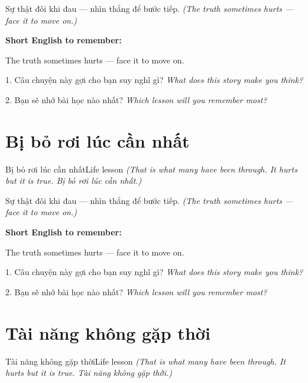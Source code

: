 \begin{baihoc}
Sự thật đôi khi đau — nhìn thẳng để bước tiếp.
\textit{(The truth sometimes hurts — face it to move on.)}
\end{baihoc}

\begin{ghinhoanh}
\textbf{Short English to remember:}

The truth sometimes hurts — face it to move on.

\end{ghinhoanh}

\begin{tuhocnhanh}
1. Câu chuyện này gợi cho bạn suy nghĩ gì? \textit{What does this story make you think?}

2. Bạn sẽ nhớ bài học nào nhất? \textit{Which lesson will you remember most?}
\end{tuhocnhanh}
\ngancach


\section{Bị bỏ rơi lúc cần nhất}
\begin{truyen}{Bị bỏ rơi lúc cần nhất}{Life lesson}
\textit{(That is what many have been through. It hurts but it is true. Bị bỏ rơi lúc cần nhất.)}
\end{truyen}

\begin{baihoc}
Sự thật đôi khi đau — nhìn thẳng để bước tiếp.
\textit{(The truth sometimes hurts — face it to move on.)}
\end{baihoc}

\begin{ghinhoanh}
\textbf{Short English to remember:}

The truth sometimes hurts — face it to move on.

\end{ghinhoanh}

\begin{tuhocnhanh}
1. Câu chuyện này gợi cho bạn suy nghĩ gì? \textit{What does this story make you think?}

2. Bạn sẽ nhớ bài học nào nhất? \textit{Which lesson will you remember most?}
\end{tuhocnhanh}
\ngancach


\section{Tài năng không gặp thời}
\begin{truyen}{Tài năng không gặp thời}{Life lesson}
\textit{(That is what many have been through. It hurts but it is true. Tài năng không gặp thời.)}
\end{truyen}

